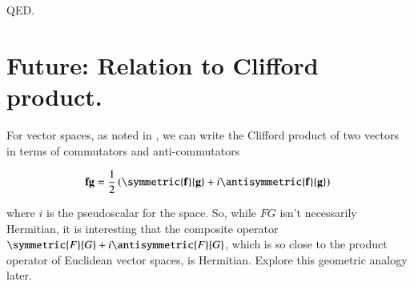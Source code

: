 QED.

\section{Future: Relation to Clifford product. }

For vector spaces, as noted in \citep{gabook:PJpauliMatrix},
we can write the Clifford product of two  vectors in terms of commutators and anti-commutators

\begin{align*}
\Bf \Bg = \inv{2} \left( \symmetric{\Bf}{\Bg} + i \antisymmetric{\Bf}{\Bg} \right)
\end{align*}

where $i$ is the pseudoscalar for the space.  So, while $FG$ isn't necessarily Hermitian, it is interesting that the composite operator
$\symmetric{F}{G} + i \antisymmetric{F}{G}$, which is so close to the product operator of Euclidean vector spaces, is Hermitian.
Explore this geometric analogy later.

%
%

%
